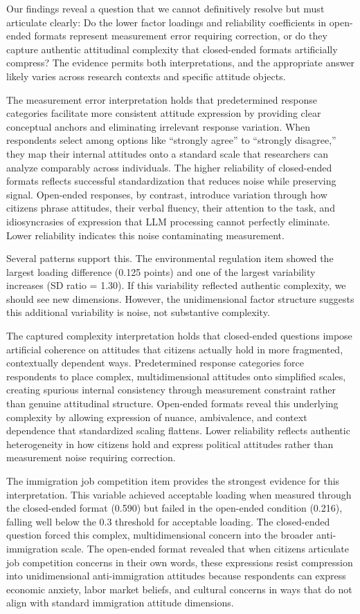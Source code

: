 \documentclass[
  journal=ram,
  manuscript=article-type,
  year=2025,
  volume=unpublished,
]{cup-journal}
\begin{document}
Our findings reveal a question that we cannot definitively resolve but must articulate clearly: Do the lower factor loadings and reliability coefficients in open-ended formats represent measurement error requiring correction, or do they capture authentic attitudinal complexity that closed-ended formats artificially compress?
The evidence permits both interpretations, and the appropriate answer likely varies across research contexts and specific attitude objects.

The measurement error interpretation holds that predetermined response categories facilitate more consistent attitude expression by providing clear conceptual anchors and eliminating irrelevant response variation.
When respondents select among options like “strongly agree” to “strongly disagree,” they map their internal attitudes onto a standard scale that researchers can analyze comparably across individuals.
The higher reliability of closed-ended formats reflects successful standardization that reduces noise while preserving signal.
Open-ended responses, by contrast, introduce variation through how citizens phrase attitudes, their verbal fluency, their attention to the task, and idiosyncrasies of expression that LLM processing cannot perfectly eliminate.
Lower reliability indicates this noise contaminating measurement.

Several patterns support this. The environmental regulation item showed the largest loading difference (0.125 points) and one of the largest variability increases (SD ratio = 1.30). If this variability reflected authentic complexity, we should see new dimensions. However, the unidimensional factor structure suggests this additional variability is noise, not substantive complexity.

The captured complexity interpretation holds that closed-ended questions impose artificial coherence on attitudes that citizens actually hold in more fragmented, contextually dependent ways.
Predetermined response categories force respondents to place complex, multidimensional attitudes onto simplified scales, creating spurious internal consistency through measurement constraint rather than genuine attitudinal structure.
Open-ended formats reveal this underlying complexity by allowing expression of nuance, ambivalence, and context dependence that standardized scaling flattens.
Lower reliability reflects authentic heterogeneity in how citizens hold and express political attitudes rather than measurement noise requiring correction.

The immigration job competition item provides the strongest evidence for this interpretation.
This variable achieved acceptable loading when measured through the closed-ended format (0.590) but failed in the open-ended condition (0.216), falling well below the 0.3 threshold for acceptable loading.
The closed-ended question forced this complex, multidimensional concern into the broader anti-immigration scale.
The open-ended format revealed that when citizens articulate job competition concerns in their own words, these expressions resist compression into unidimensional anti-immigration attitudes because respondents can express economic anxiety, labor market beliefs, and cultural concerns in ways that do not align with standard immigration attitude dimensions.
\end{document}
